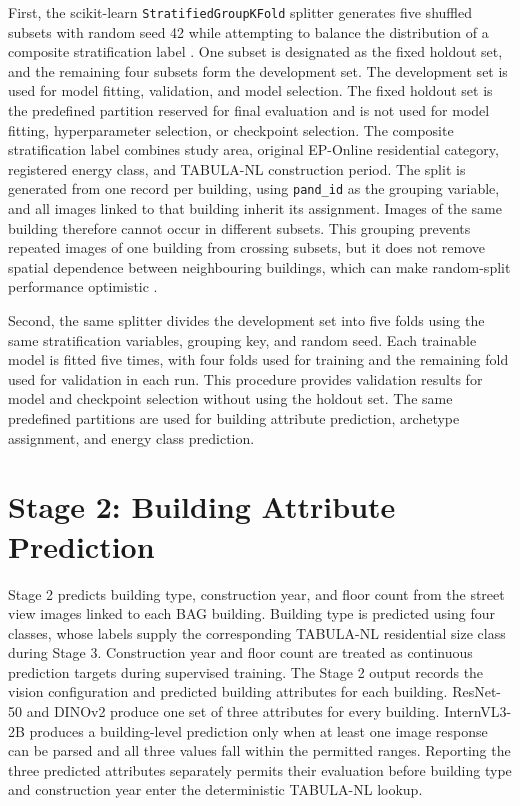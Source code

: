 First, the scikit-learn \texttt{StratifiedGroupKFold} splitter generates five shuffled subsets with random seed 42 while attempting to balance the distribution of a composite stratification label \parencite{pedregosa2011}.
One subset is designated as the fixed holdout set, and the remaining four subsets form the development set.
The development set is used for model fitting, validation, and model selection.
The fixed holdout set is the predefined partition reserved for final evaluation and is not used for model fitting, hyperparameter selection, or checkpoint selection.
The composite stratification label combines study area, original EP-Online residential category, registered energy class, and TABULA-NL construction period.
The split is generated from one record per building, using \texttt{pand\_id} as the grouping variable, and all images linked to that building inherit its assignment.
Images of the same building therefore cannot occur in different subsets.
This grouping prevents repeated images of one building from crossing subsets, but it does not remove spatial dependence between neighbouring buildings, which can make random-split performance optimistic \parencite{garbasevschi2021}.

Second, the same splitter divides the development set into five folds using the same stratification variables, grouping key, and random seed. Each trainable model is fitted five times, with four folds used for training and the remaining fold used for validation in each run. This procedure provides validation results for model and checkpoint selection without using the holdout set.
The same predefined partitions are used for building attribute prediction, archetype assignment, and energy class prediction.

\section{Stage 2: Building Attribute Prediction}
\label{sec:vision_inference_strategies}

Stage 2 predicts building type, construction year, and floor count from the street view images linked to each BAG building.
Building type is predicted using four classes, whose labels supply the corresponding TABULA-NL residential size class during Stage 3.
Construction year and floor count are treated as continuous prediction targets during supervised training.
The Stage 2 output records the vision configuration and predicted building attributes for each building.
ResNet-50 and DINOv2 produce one set of three attributes for every building.
InternVL3-2B produces a building-level prediction only when at least one image response can be parsed and all three values fall within the permitted ranges.
Reporting the three predicted attributes separately permits their evaluation before building type and construction year enter the deterministic TABULA-NL lookup.

